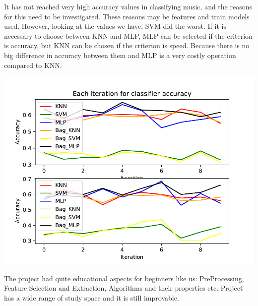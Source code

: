 \documentclass{article}
\begin{document}
It has not reached very high accuracy values in classifying music, and the reasons for this need to be investigated. These reasons may be features and train models used. However, looking at the values we have, SVM did the worst. If it is necessary to choose between KNN and MLP, MLP can be selected if the criterion is accuracy, but KNN can be chosen if the criterion is speed. Because there is no big difference in accuracy between them and MLP is a very costly operation compared to KNN.

\begin{center}
    \vspace{1em}
        \includegraphics[scale=0.75]{graphs/Iter_by_iter.pdf}
    \vspace{1em}
\end{center}

The project had quite educational aspects for beginners like us: PreProcessing, Feature Selection and Extraction, Algorithms and their properties etc. Project has a wide range of study space and it is still improvable. 
\end{document}

